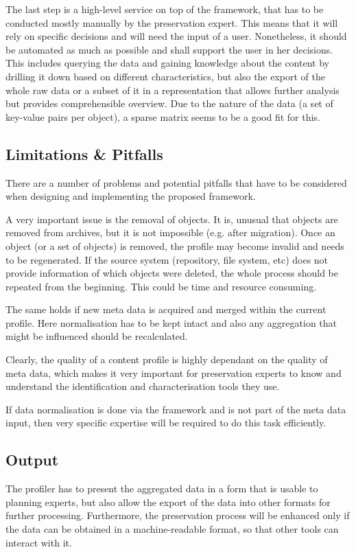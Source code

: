 The last step is a high-level service on top of the framework, that has to be conducted mostly manually by the preservation expert. This means that it will rely on specific decisions and will need the input of a user. Nonetheless, it should be automated as much as possible and shall support the user in her decisions. This includes querying the data and gaining knowledge about the content by drilling it down based on different characteristics, but also the export of the whole raw data or a subset of it in a representation that allows further analysis but provides comprehensible overview.
Due to the nature of the data (a set of key-value pairs per object), a sparse matrix seems to be a good fit for this.

\subsection{Limitations \& Pitfalls}
There are a number of problems and potential pitfalls that have to be considered when designing and implementing the proposed framework.

A very important issue is the removal of objects. It is, unusual that objects are removed from archives, but it is not impossible (e.g. after migration). Once an object (or a set of objects) is removed, the profile may become invalid and needs to be regenerated. If the source system (repository, file system, etc) does not provide information of which objects were deleted, the whole process should be repeated from the beginning. This could be time and resource consuming.

The same holds if new meta data is acquired and merged within the current profile. Here normalisation has to be kept intact and also any aggregation that might be influenced should be recalculated.

Clearly, the quality of a content profile is highly dependant on the quality of meta data, which makes it very important for preservation experts to know and understand the identification and characterisation tools they use.

If data normalisation is done via the framework and is not part of the meta data input, then very specific expertise will be required to do this task efficiently.

\subsection{Output}
\label{lbl:output_spec}
The profiler has to present the aggregated data in a form that is usable to planning experts, but also allow the export of the data into other formats for further processing. Furthermore, the preservation process will be enhanced only if the data
can be obtained in a machine-readable format, so that other tools can interact with it.

